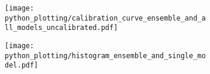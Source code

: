 \begin{figure}
    \begin{subfigure}[c]{0.48\columnwidth}
        \centering
        \texttt{[image: python\_plotting/calibration\_curve\_ensemble\_and\_all\_models\_uncalibrated.pdf]}
        \caption{}
        \label{fig_discussion:calibration_curve_ensemble_and_all_models_uncalibrated}
    \end{subfigure}
    \begin{subfigure}[c]{0.48\columnwidth}
        \centering
        \texttt{[image: python\_plotting/histogram\_ensemble\_and\_single\_model.pdf]}
        \caption{}
        \label{fig_hierarchical:histogram_ensemble_and_single_model}
    \end{subfigure}
\end{figure}


